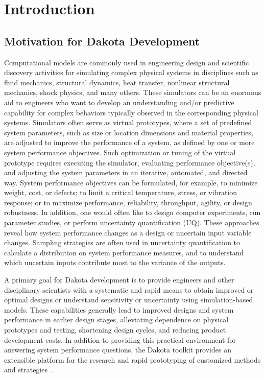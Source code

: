 \chapter{Introduction}\label{intro}

\section{Motivation for Dakota Development}\label{intro:motivation}

Computational models are commonly used in engineering design and
scientific discovery activities for simulating complex physical
systems in disciplines such as fluid mechanics, structural dynamics,
heat transfer, nonlinear structural mechanics, shock physics, and many
others. These simulators can be an enormous aid to engineers who want
to develop an understanding and/or predictive capability for complex
behaviors typically observed in the corresponding physical
systems. Simulators often serve as virtual prototypes, where a set of
predefined system parameters, such as size or location dimensions and
material properties, are adjusted to improve the performance of a
system, as defined by one or more system performance objectives. Such
optimization or tuning of the virtual prototype requires executing the
simulator, evaluating performance objective(s), and adjusting the
system parameters in an iterative, automated, and directed way. System
performance objectives can be formulated, for example, to minimize
weight, cost, or defects; to limit a critical temperature, stress, or
vibration response; or to maximize performance, reliability,
throughput, agility, or design robustness. In addition, one would
often like to design computer experiments, run parameter studies, or
perform uncertainty quantification (UQ). These approaches reveal how
system performance changes as a design or uncertain input variable
changes. Sampling strategies are often used in uncertainty
quantification to calculate a distribution on system performance
measures, and to understand which uncertain inputs contribute most to
the variance of the outputs.

A primary goal for Dakota development is to provide engineers and
other disciplinary scientists with a systematic and rapid means to
obtain improved or optimal designs or understand sensitivity or
uncertainty using simulation-based models. These capabilities
generally lead to improved designs and system performance in earlier
design stages, alleviating dependence on physical prototypes and
testing, shortening design cycles, and reducing product development
costs. In addition to providing this practical environment for
answering system performance questions, the Dakota toolkit provides an
extensible platform for the research and rapid prototyping of
customized methods and strategies~\cite{Eld98b}.

